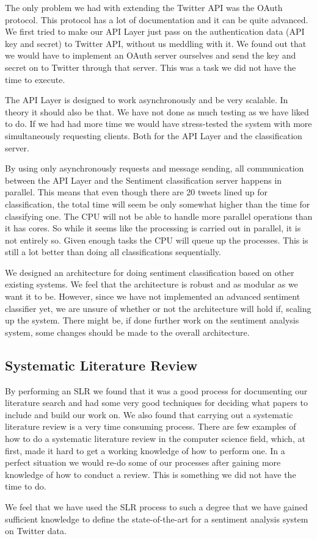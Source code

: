 The only problem we had with extending the Twitter API was the OAuth protocol. This protocol has a lot of documentation and it can be quite advanced. We first tried to make our API Layer just pass on the authentication data (API key and secret) to Twitter API, without us meddling with it. We found out that we would have to implement an OAuth server ourselves and send the key and secret on to Twitter through that server. This was a task we did not have the time to execute. 

The API Layer is designed to work asynchronously and be very scalable. In theory it should also be that. We have not done as much testing as we have liked to do. If we had had more time we would have stress-tested the system with more simultaneously requesting clients. Both for the API Layer and the classification server. 

By using only asynchronously requests and message sending, all communication between the API Layer and the Sentiment classification server happens in parallel. This means that even though there are 20 tweets lined up for classification, the total time will seem be only somewhat higher than the time for classifying one. The CPU will not be able to handle more parallel operations than it has cores. So while it seems like the processing is carried out in parallel, it is not entirely so. Given enough tasks the CPU will queue up the processes. This is still a lot better than doing all classifications sequentially. 

We designed an architecture for doing sentiment classification based on other existing systems. We feel that the architecture is robust and as modular as we want it to be. However, since we have not implemented an advanced sentiment classifier yet, we are unsure of whether or not the architecture will hold if, scaling up the system. There might be, if done further work on the sentiment analysis system, some changes should be made to the overall architecture. 


\subsection{Systematic Literature Review}

By performing an SLR we found that it was a good process for documenting our literature search and had some very good techniques for deciding what papers to include and build our work on. We also found that carrying out a systematic literature review is a very time consuming process. There are few examples of how to do a systematic literature review in the computer science field, which, at first, made it hard to get a working knowledge of how to perform one. In a perfect situation we would re-do some of our processes after gaining more knowledge of how to conduct a review. This is something we did not have the time to do. 

We feel that we have used the SLR process to such a degree that we have gained sufficient knowledge to define the state-of-the-art for a sentiment analysis system on Twitter data. 